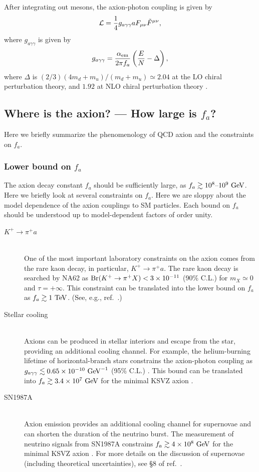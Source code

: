 \documentclass[11pt,a4paper]{article}
\begin{document}
After integrating out mesons, the axion-photon coupling is given by
\begin{align}
    {\cal L} = \frac{1}{4} g_{a\gamma\gamma} a F_{\mu\nu} \tilde F^{\mu\nu},
\end{align}
where $g_{a\gamma\gamma}$ is given by
\begin{align}
    g_{a\gamma\gamma} = \frac{\alpha_{\rm em}}{2\pi f_a} \left( \frac{E}{N} - \Delta \right),
\end{align}
where $\Delta$ is $(2/3)(4m_d + m_u)/(m_d + m_u) \simeq 2.04$ at the LO chiral perturbation theory, and $1.92$ at NLO chiral perturbation theory \cite{GrillidiCortona:2015jxo}.

\subsection{Where is the axion? --- How large is $f_a$?}
Here we briefly summarize the phenomenology of QCD axion and the constraints on $f_a$.

\subsubsection{Lower bound on $f_a$}
The axion decay constant $f_a$ should be sufficiently large, as $f_a \gtrsim 10^8\text{--}10^9~{\rm GeV}$. Here we briefly look at several constraints on $f_a$.
Here we are sloppy about the model dependence of the axion couplings to SM particles. 
Each bound on \(f_a\) should be understood up to model-dependent factors of order unity.

\begin{description}
    \item[$K^+ \to \pi^+ a$]~\\
One of the most important laboratory constraints on the axion comes from the rare kaon decay, in particular, $K^+ \to \pi^+ a$.
The rare kaon decay is searched by NA62 \cite{NA62:2025upx} as ${\rm Br}(K^+ \to \pi^+ X) < 3 \times 10^{-11}$ (90\% C.L.) for $m_X \simeq 0$ and $\tau = +\infty$. This constraint can be translated into the lower bound on $f_a$ as $f_a \gtrsim 1~{\rm TeV}$. (See, e.g., ref.~\cite{Fukuda:2015ana}.)
    \item[Stellar cooling]~\\
Axions can be produced in stellar interiors and escape from the star, providing an additional cooling channel. 
For example, the helium-burning lifetime of horizontal-branch stars constrains the axion-photon coupling as $g_{a\gamma\gamma} \lesssim 0.65 \times 10^{-10}~{\rm GeV}^{-1}$ (95\% C.L.) \cite{Caputo:2024oqc}. This bound can be translated into $f_a \gtrsim 3.4 \times 10^7~{\rm GeV}$ for the minimal KSVZ axion \cite{Caputo:2024oqc}.
    \item[SN1987A]~\\ 
Axion emission provides an additional cooling channel for supernovae and can shorten the duration of the neutrino burst. The measurement of neutrino signals from SN1987A constrains $f_a \gtrsim 4 \times 10^8~{\rm GeV}$ for the minimal KSVZ axion \cite{Caputo:2024oqc}. For more details on the discussion of supernovae (including theoretical uncertainties), see \S 8 of ref.~\cite{Caputo:2024oqc}.
\end{description}
\end{document}
